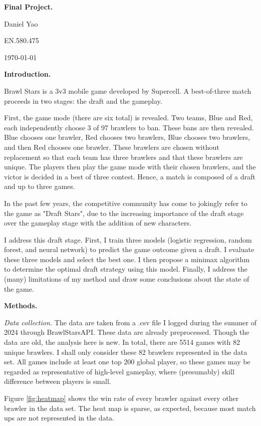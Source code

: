 \documentclass[12pt]{article}
\begin{document}
\textbf{Final Project.}

Daniel Yao

EN.580.475

\today

\textbf{Introduction.}

Brawl Stars is a 3v3 mobile game developed by Supercell. A best-of-three match proceeds in two stages: the draft and the gameplay.

First, the game mode (there are six total) is revealed. Two teams, Blue and Red, each independently choose 3 of 97 brawlers to ban. These bans are then revealed. Blue chooses one brawler, Red chooses two brawlers, Blue chooses two brawlers, and then Red chooses one brawler. These brawlers are chosen without replacement so that each team has three brawlers and that these brawlers are unique. The players then play the game mode with their chosen brawlers, and the victor is decided in a best of three contest. Hence, a match is composed of a draft and up to three games.

In the past few years, the competitive community has come to jokingly refer to the game as "Draft Stars", due to the increasing importance of the draft stage over the gameplay stage with the addition of new characters.

I address this draft stage. First, I train three models (logistic regression, random forest, and neural network) to predict the game outcome given a draft. I evaluate these three models and select the best one. I then propose a minimax algorithm to determine the optimal draft strategy using this model. Finally, I address the (many) limitations of my method and draw some conclusions about the state of the game.

\textbf{Methods.}

\textit{Data collection.} The data are taken from a .csv file I logged during the summer of 2024 through BrawlStarsAPI. These data are already preprocessed. Though the data are old, the analysis here is new. In total, there are 5514 games with 82 unique brawlers. I shall only consider these 82 brawlers represented in the data set. All games include at least one top 200 global player, so these games may be regarded as representative of high-level gameplay, where (presumably) skill difference between players is small.

Figure \ref{fig:heatmap} shows the win rate of every brawler against every other brawler in the data set. The heat map is sparse, as expected, because most match ups are not represented in the data.
\end{document}
